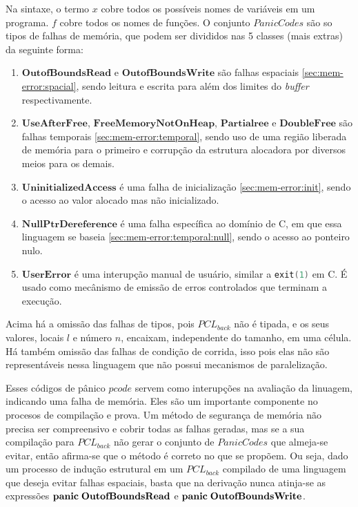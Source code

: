 \noindent Na sintaxe, o termo $x$ cobre todos os possíveis nomes de variáveis em um programa. 
$f$ cobre todos os nomes de funções. O conjunto $PanicCodes$ são so tipos de falhas de memória, que podem ser divididos nas 5 classes (mais extras) da seguinte forma:
\begin{enumerate}
	\item $\mathbf{OutofBoundsRead}$ e $\mathbf{OutofBoundsWrite}$ são falhas espaciais \ref{sec:mem-error:spacial}, sendo leitura e escrita para além dos limites do \emph{buffer} respectivamente.
	\item $\mathbf{UseAfterFree}$, $\mathbf{FreeMemoryNotOnHeap}$, $\mathbf{Partial ree}$ e $\mathbf{Double Free}$ são falhas temporais \ref{sec:mem-error:temporal}, sendo uso de uma região liberada de memória para o primeiro e corrupção da estrutura alocadora por diversos meios para os demais.
	\item $\mathbf{UninitializedAccess}$ é uma falha de inicialização \ref{sec:mem-error:init}, sendo o acesso ao valor alocado mas não inicializado. 
	\item $\mathbf{NullPtrDereference}$ é uma falha específica ao domínio de C, em que essa linguagem se baseia \ref{sec:mem-error:temporal:null}, sendo o acesso ao ponteiro nulo.
	\item $\mathbf{UserError}$ é uma interupção manual de usuário, similar a \lstinline[language=C]|exit(1)| em C. É usado como mecânismo de emissão de erros controlados que terminam a execução.
\end{enumerate}

\noindent Acima há a omissão das falhas de tipos, pois $PCL_{back}$ não é tipada, e os seus valores, locais $l$ e número $n$, encaixam, independente do tamanho, em uma célula. Há também omissão das falhas de condição de corrida, isso pois elas não são representáveis nessa linguagem que não possui mecanismos de paralelização.

Esses códigos de pânico $pcode$ servem como interupções na avaliação da linuagem, indicando uma falha de memória. Eles são um importante componente no procesos de compilação e prova. Um método de segurança de memória não precisa ser compreensivo e cobrir todas as falhas geradas, mas se a sua compilação para $PCL_{back}$ não gerar o conjunto de $PanicCodes$ que almeja-se evitar, então afirma-se que o método é correto no que se propõem. Ou seja, dado um processo de indução estrutural em um $PCL_{back}$ compilado de uma linguagem que deseja evitar falhas espaciais, basta que na derivação nunca atinja-se as expressões $\mathbf{panic}\;\mathbf{OutofBoundsRead}$ e $\mathbf{panic}\;\mathbf{OutofBoundsWrite}$.

